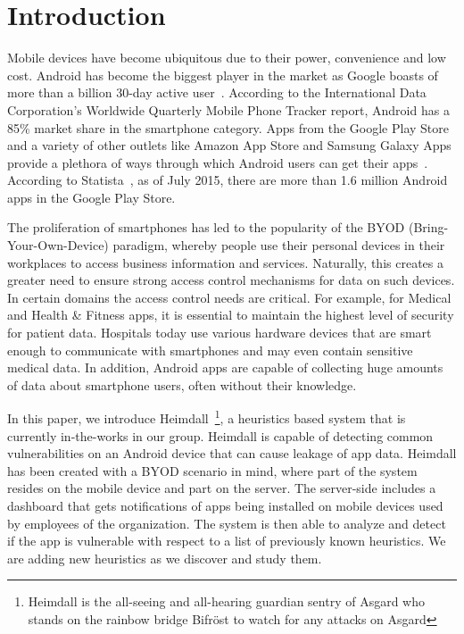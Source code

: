 \section{Introduction}
\label{intro}
\noindent
Mobile devices have become ubiquitous due to their power, convenience and low cost. Android has become the biggest player in the market as Google boasts of more than a billion 30-day active user~\cite{Engadget_market_share}. According to the International Data Corporation's Worldwide Quarterly Mobile Phone Tracker report, Android has a 85\% market share in the smartphone category. Apps from the Google Play Store and a variety of other outlets like Amazon App Store and Samsung Galaxy Apps provide a plethora of ways through which Android users can get their apps~\cite{Online_App_Stores}. According to Statista~\cite{Android_app_number}, as of July 2015, there are more than 1.6 million Android apps in the Google Play Store.

The proliferation of smartphones has led to the popularity of the BYOD (Bring-Your-Own-Device) paradigm, whereby people use their personal devices in their workplaces to access business information and services. Naturally, this creates a greater need to ensure strong access control mechanisms for data on such devices. In certain domains the access control needs are critical. For example, for Medical and Health \& Fitness apps, it is essential to maintain the highest level of security for patient data. Hospitals today use various hardware devices that are smart enough to communicate with smartphones and may even contain sensitive medical data. In addition, Android apps are capable of collecting huge amounts of data about smartphone users, often without their knowledge.

In this paper, we introduce Heimdall~\footnote{Heimdall is the all-seeing and all-hearing guardian sentry of Asgard who stands on the rainbow bridge Bifr\"{o}st to watch for any attacks on Asgard}, a heuristics based system that is currently in-the-works in our group. Heimdall is capable of detecting common vulnerabilities on an Android device that can cause leakage of app data. Heimdall has been created with a BYOD scenario in mind, where part of the system resides on the mobile device and part on the server. The server-side includes a dashboard that gets notifications of apps being installed on mobile devices used by employees of the organization. The system is then able to analyze and detect if the app is vulnerable with respect to a list of previously known heuristics. We are adding new heuristics as we discover and study them. %

